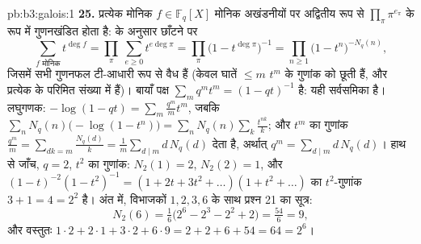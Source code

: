 \begin{solution}{pb:b3:galois:1}
\textbf{25.} प्रत्येक मोनिक $f \in \mathbb F_q[X]$ मोनिक अखंडनीयों पर अद्वितीय रूप
से $\prod_\pi\pi^{e_\pi}$ के रूप में गुणनखंडित होता है:  के अनुसार छाँटने पर
\[
\sum_{f \text{ मोनिक}}t^{\deg f}
= \prod_\pi\ \sum_{e \geq 0}t^{e\deg\pi}
= \prod_\pi\bigl(1 - t^{\deg\pi}\bigr)^{-1}
= \prod_{n \geq 1}\bigl(1 - t^n\bigr)^{-N_q(n)},
\]
जिसमें सभी गुणनफल टी-आधारी रूप से वैध हैं (केवल घातें $\leq m$ $t^m$
के गुणांक को छूती हैं, और प्रत्येक  के  परिमित संख्या
में हैं)। बायाँ पक्ष $\sum_m
q^mt^m = (1 - qt)^{-1}$ है: यही सर्वसमिका है। लघुगणक: $-\log(1 -
qt) = \sum_m\frac{q^m}mt^m$,
जबकि $\sum_nN_q(n)\bigl(-\log(1
- t^n)\bigr) = \sum_nN_q(n)\sum_k\frac{t^{nk}}k$; और $t^m$ का गुणांक $\frac{q^m}m = \sum_{dk = m}
\frac{N_q(d)}k = \frac1m\sum_{d \mid m}d\,N_q(d)$ देता है, अर्थात् $q^m = \sum_{d\mid m}d\,N_q(d)$। हाथ
से जाँच, $q = 2$, $t^2$ का गुणांक: $N_2(1) = 2$, $N_2(2) = 1$, और $(1 - t)^{-2}(1 - t^2)^{-1} = (1 + 2t + 3t^2 + \dots)(1 + t^2
+ \dots)$ का
$t^2$-गुणांक $3 + 1 = 4 = 2^2$ है। अंत में, विभाजकों $1, 2, 3, 6$ के साथ प्रश्न 21 का
सूत्र:
\[
N_2(6) = \tfrac16\bigl(2^6 - 2^3 - 2^2 + 2\bigr)
= \tfrac{54}6 = 9,
\]
और वस्तुतः $1\cdot2 + 2\cdot1 + 3\cdot2 + 6\cdot9 = 2 + 2 +
6 + 54 = 64 = 2^6$।
\end{solution}
